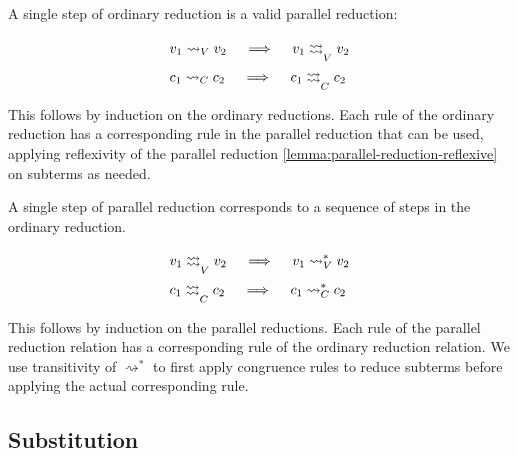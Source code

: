 \documentclass[acmsmall, screen, review, anonymous]{acmart}
\makeatletter
\theoremstyle{definition}
\newcommand{\stepstoname}{\rightsquigarrow}
\newcommand{\stepstov}{\stepstoname_V}
\newcommand{\stepstoc}{\stepstoname_C}
\newcommand{\reducestoname}{\stepstoname^{*}}
\newcommand{\reducestov}{\reducestoname_{V}}
\newcommand{\reducestoc}{\reducestoname_{C}}
\newcommand{\drightsquigarrow}{\begin{array}{@{}c@{}}\rightsquigarrow \\[-8pt] \rightsquigarrow\end{array}}
\newcommand{\parastepstoname}{\drightsquigarrow}
\newcommand{\parastepstov}{\mathrel{\parastepstoname_{V}}}
\newcommand{\parastepstoc}{\mathrel{\parastepstoname_{C}}}
\makeatother
\begin{document}
A single step of ordinary reduction is a valid parallel reduction:
\begin{lemma}
\label{lemma:parallel-reduction-of-reduction}
  \begin{align*}
    &v_1 \stepstov v_2
    \quad \implies \quad v_1 \parastepstov v_2 \\
    &c_1 \stepstoc c_2
    \quad \implies \quad c_1 \parastepstoc c_2
  \end{align*}
\end{lemma}
This follows by induction on the ordinary reductions. Each rule of the
ordinary reduction has a corresponding rule in the parallel reduction
that can be used, applying reflexivity of the parallel reduction
\ref{lemma:parallel-reduction-reflexive} on subterms as needed.

A single step of parallel reduction corresponds to a sequence of steps
in the ordinary reduction.
\begin{lemma}
\label{lemma:reductions-of-parallel-reduction}
  \begin{align*}
    &v_1 \parastepstov v_2
    \quad \implies \quad v_1 \reducestov v_2 \\
    &c_1 \parastepstoc c_2
    \quad \implies \quad c_1 \reducestoc c_2
  \end{align*}
\end{lemma}
This follows by induction on the parallel reductions. Each rule of the
parallel reduction relation has a corresponding rule of the ordinary
reduction relation. We use transitivity of $\reducestoname$ to first
apply congruence rules to reduce subterms before applying the actual
corresponding rule.

\subsection{Substitution}
\end{document}
